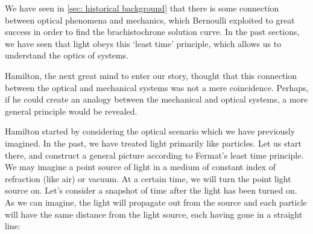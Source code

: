 We have seen in \autoref{sec: historical background} that there is some connection between optical phenomena and mechanics, which Bernoulli exploited to great success in order to find the brachistochrone solution curve. In the past sections, we have seen that light obeys this `least time' principle, which allows us to understand the optics of systems.

Hamilton, the next great mind to enter our story, thought that this connection between the optical and mechanical systems was not a mere coincidence. Perhaps, if he could create an analogy between the mechanical and optical systems, a more general principle would be revealed.

Hamilton started by considering the optical scenario which we have previously imagined. In the past, we have treated light primarily like particles. Let us start there, and construct a general picture according to Fermat's least time principle. We may imagine a point source of light in a medium of constant index of refraction (like air) or vacuum. At a certain time, we will turn the point light source on. Let's consider a snapshot of time after the light has been turned on. As we can imagine, the light will propagate out from the source and each particle will have the same distance from the light source, each having gone in a straight line:

